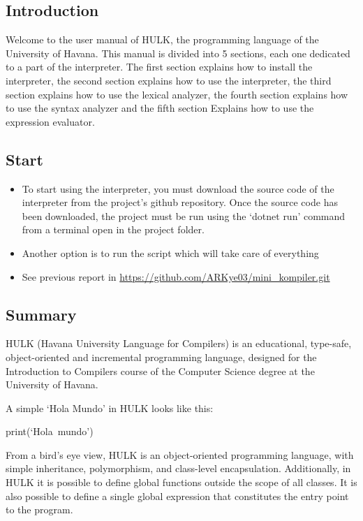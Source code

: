 \newcommand{\copiabletext}[2]{%
    \href{#2}{\texttt{#1}}%
}

\begin{center}
    \centering
    \section{Introduction}
\end{center}
Welcome to the user manual of HULK, the programming language of the University of Havana. This manual is divided into 5 sections, each one dedicated to a part of the interpreter. The first section explains how to install the interpreter, the second section explains how to use the interpreter, the third section explains how to use the lexical analyzer, the fourth section explains how to use the syntax analyzer and the fifth section Explains how to use the expression evaluator.

\subsection{Start}
    \begin{itemize}
        \item To start using the interpreter, you must download the source code of the interpreter from the project's github repository. Once the source code has been downloaded, the project must be run using the `dotnet run' command from a terminal open in the project folder.
        \item Another option is to run the script which will take care of everything
        \item See previous report in \url{https://github.com/ARKye03/mini_kompiler.git}
    \end{itemize}
    
\subsection{Summary}
HULK (Havana University Language for Compilers) is an educational, type-safe, object-oriented and incremental programming language, designed for the Introduction to Compilers course of the Computer Science degree at the University of Havana.

A simple `Hola Mundo' in HULK looks like this:

    \hbox{print{(`Hola mundo')}}

    From a bird's eye view, HULK is an object-oriented programming language, with simple inheritance, polymorphism, and class-level encapsulation. Additionally, in HULK it is possible to define global functions outside the scope of all classes. It is also possible to define a single global expression that constitutes the entry point to the program.

